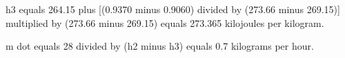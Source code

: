h3 equals 264.15 plus [(0.9370 minus 0.9060) divided by (273.66 minus 269.15)] multiplied by (273.66 minus 269.15) equals 273.365 kilojoules per kilogram.  

m dot equals 28 divided by (h2 minus h3) equals 0.7 kilograms per hour.